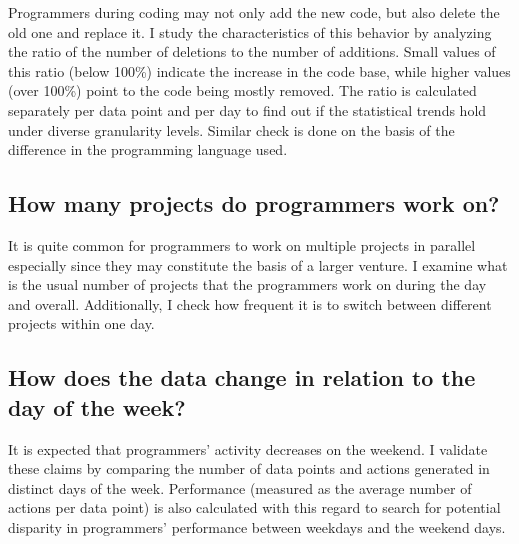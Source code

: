 Programmers during coding may not only add the new code, but also delete the old one and replace it. I study the characteristics of this behavior by analyzing the ratio of the number of deletions to the number of additions. Small values of this ratio (below 100\%) indicate the increase in the code base, while higher values (over 100\%) point to the code being mostly removed. The ratio is calculated separately per data point and per day to find out if the statistical trends hold under diverse granularity levels. Similar check is done on the basis of the difference in the programming language used.

\subsection{How many projects do programmers work on?}

It is quite common for programmers to work on multiple projects in parallel especially since they may constitute the basis of a larger venture. I examine what is the usual number of projects that the programmers work on during the day and overall. Additionally, I check how frequent it is to switch between different projects within one day.



\subsection{How does the data change in relation to the day of the week?}

It is expected that programmers' activity decreases on the weekend. I validate these claims by comparing the number of data points and actions generated in distinct days of the week. Performance (measured as the average number of actions per data point) is also calculated with this regard to search for potential disparity in programmers' performance between weekdays and the weekend days.

